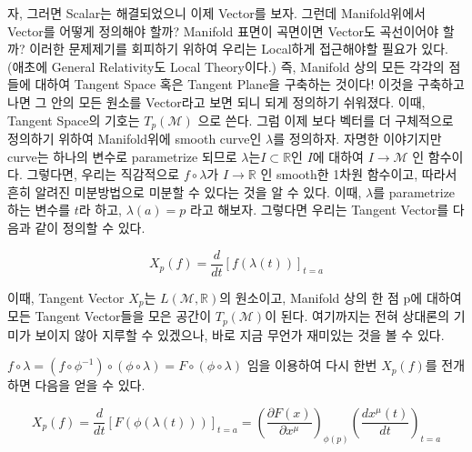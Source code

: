 \documentclass[paper=a4, fontsize=11pt]{scrartcl} %
\numberwithin{equation}{section} %
\numberwithin{figure}{section} %
\numberwithin{table}{section} %
\theoremstyle{plain}
\newcommand{\HS}{\hspace{0.5cm}}
\newcommand{\VS}{\vspace{0.3cm}}
\begin{document}
 \VS
 
 \HS 자, 그러면 Scalar는 해결되었으니 이제 Vector를 보자. 그런데 Manifold위에서 Vector를 어떻게 정의해야 할까? Manifold 표면이 곡면이면 Vector도 곡선이어야 할까?
 이러한 문제제기를 회피하기 위하여 우리는 Local하게 접근해야할 필요가 있다. (애초에 General Relativity도 Local Theory이다.)
 즉, Manifold 상의 모든 각각의 점들에 대하여
 Tangent Space 혹은 Tangent Plane을 구축하는 것이다! 이것을 구축하고 나면 그 안의 모든 원소를 Vector라고 보면 되니 되게 정의하기 쉬워졌다.\footnotemark
 이때, Tangent Space의 기호는   $T_{p} (\mathcal{M})$ 으로 쓴다. 그럼 이제 보다 벡터를 더 구체적으로 정의하기 위하여 Manifold위에 smooth curve인 $\lambda$를 정의하자.
 자명한 이야기지만 curve는 하나의 변수로 parametrize 되므로 $\lambda$는$I\subset\mathbb{R}$인 $I$에 대하여 $I \rightarrow \mathcal{M}$ 인 함수이다. 그렇다면, 우리는
 직감적으로 $ f \circ \lambda$가 $I \rightarrow \mathbb{R}$ 인 smooth한 1차원 함수이고, 따라서 흔히 알려진 미분방법으로 미분할 수 있다는 것을 알 수 있다.
 이때, $\lambda$를 parametrize하는 변수를 $t$라 하고, $\lambda (a) = p$ 라고 해보자. 그렇다면 우리는 Tangent Vector를 다음과 같이 정의할 수 있다.
 
 \begin{equation}
  X_p (f) = \frac{d}{dt} [f(\lambda (t))]_{t=a}
 \end{equation}

 이때, Tangent Vector $X_p$는 $L(\mathcal{M}, \mathbb{R})$의 원소이고,  Manifold 상의 한 점 p에 대하여 모든 Tangent Vector들을 모은 공간이 $T_p (\mathcal{M})$이 된다.
 여기까지는 전혀 상대론의 기미가 보이지 않아 지루할 수 있겠으나, 바로 지금 무언가 재미있는 것을 볼 수 있다.
 
\HS $f\circ\lambda = (f\circ\phi^{-1})\circ (\phi\circ\lambda)=F\circ(\phi\circ\lambda)$ 임을 이용하여 다시 한번 $X_p (f)$를 전개하면 다음을 얻을 수 있다.

\begin{equation}
 \label{eq:tan}
 X_p (f) = \frac{d}{dt}[F(\phi(\lambda (t)))]_{t=a} = \left( \frac{\partial F(x)}{\partial x^{\mu}} \right)_{\phi(p)} \left(\frac{dx^{\mu}(t)}{dt}\right)_{t=a}
\end{equation}
\end{document}
